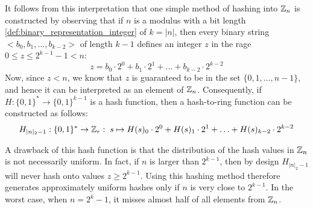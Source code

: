 It follows from this interpretation that one simple method of hashing into $\mathbb{Z}_n$ is constructed by observing that if $n$ is a modulus with a bit length \eqref{def:binary_representation_integer} of $k=|n|$, then every binary string $<b_0,b_1,\ldots,b_{k-2}>$ of length $k-1$ defines an integer $z$ in the rage $0\leq z \leq 2^{k-1}-1< n $:
\begin{equation}
z = b_0\cdot 2^0 + b_1\cdot 2^1 + \ldots + b_{k-2}\cdot 2^{k-2}
\end{equation}
Now, since $z<n$, we know that $z$ is guaranteed to be in the set $\{0,1,\ldots,n-1\}$, and hence it can be interpreted as an element of $\mathbb{Z}_n$. Consequently, if $H:\{0,1\}^*\to\{0,1\}^{k-1}$ is a hash function, then a hash-to-ring function can be constructed as follows:
\begin{equation}\label{eq:hash-Zr}
H_{|n|_2-1}: \{0,1\}^* \to \mathbb{Z}_r: \; s \mapsto
H(s)_0\cdot 2^0 + H(s)_1\cdot 2^1 + \ldots + H(s)_{k-2}\cdot 2^{k-2}
\end{equation}

A drawback of this hash function is that the distribution of the hash values in $\mathbb{Z}_n$ is not necessarily uniform. In fact, if $n$ is larger than $2^{k-1}$, then by design $H_{|n|_2-1}$ will never hash onto values $z\geq 2^{k-1}$. Using this hashing method therefore generates approximately uniform hashes only if $n$ is very close to $2^{k-1}$. In the worst case, when $n=2^k-1$, it misses almost half of all elements from $\mathbb{Z}_n$.

